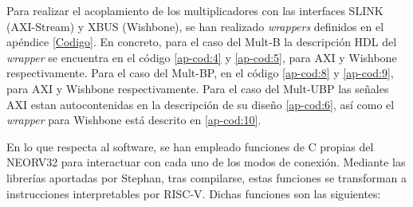 Para realizar el acoplamiento de los multiplicadores con las interfaces SLINK (AXI-Stream) y XBUS (Wishbone), se han realizado \textit{wrappers} definidos en el apéndice \ref{Codigo}.
En concreto, para el caso del Mult-B la descripción HDL del \textit{wrapper} se encuentra en el código \ref{ap-cod:4} y \ref{ap-cod:5}, para AXI y Wishbone respectivamente.
Para el caso del Mult-BP, en el código \ref{ap-cod:8} y \ref{ap-cod:9}, para AXI y Wishbone respectivamente.
Para el caso del Mult-UBP las señales AXI estan autocontenidas en la descripción de su diseño \ref{ap-cod:6}, así como el \textit{wrapper} para Wishbone está descrito en \ref{ap-cod:10}.

En lo que respecta al software, se han empleado funciones de C propias del NEORV32 para interactuar con cada uno de los modos de conexión.
Mediante las librerías aportadas por Stephan, tras compilarse, estas funciones se transforman a instrucciones interpretables por RISC-V.
Dichas funciones son las siguientes:
